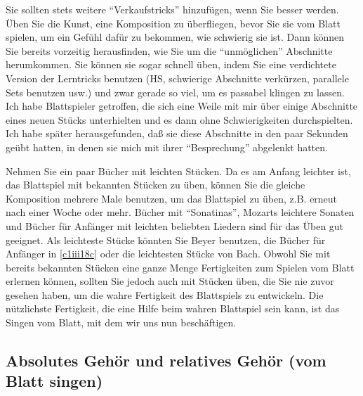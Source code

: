 Sie sollten stets weitere \enquote{Verkaufstricks} hinzufügen, wenn Sie besser werden.
Üben Sie die Kunst, eine Komposition zu überfliegen, bevor Sie sie vom Blatt spielen, um ein Gefühl dafür zu bekommen, wie schwierig sie ist.
Dann können Sie bereits vorzeitig herausfinden, wie Sie um die \enquote{unmöglichen} Abschnitte herumkommen.
Sie können sie sogar schnell üben, indem Sie eine verdichtete Version der Lerntricks benutzen (HS, schwierige Abschnitte verkürzen, parallele Sets benutzen usw.) und zwar gerade so viel, um es passabel klingen zu lassen.
Ich habe Blattspieler getroffen, die sich eine Weile mit mir über einige Abschnitte eines neuen Stücks unterhielten und es dann ohne Schwierigkeiten durchspielten.
Ich habe später herausgefunden, daß sie diese Abschnitte in den paar Sekunden geübt hatten, in denen sie mich mit ihrer \enquote{Besprechung} abgelenkt hatten.

Nehmen Sie ein paar Bücher mit leichten Stücken.
Da es am Anfang leichter ist, das Blattspiel mit bekannten Stücken zu üben, können Sie die gleiche Komposition mehrere Male benutzen, um das Blattspiel zu üben, z.B. erneut nach einer Woche oder mehr.
Bücher mit \enquote{Sonatinas}, Mozarts leichtere Sonaten und Bücher für Anfänger mit leichten beliebten Liedern sind für das Üben gut geeignet.
Als leichteste Stücke könnten Sie Beyer benutzen, die Bücher für Anfänger in \autoref{c1iii18c} oder die leichtesten Stücke von Bach. 
Obwohl Sie mit bereits bekannten Stücken eine ganze Menge Fertigkeiten zum Spielen vom Blatt erlernen können, sollten Sie jedoch auch mit Stücken üben, die Sie nie zuvor gesehen haben, um die wahre Fertigkeit des Blattspiels zu entwickeln.
Die nützlichste Fertigkeit, die eine Hilfe beim wahren Blattspiel sein kann, ist das Singen vom Blatt, mit dem wir uns nun beschäftigen.


\subsection{Absolutes Gehör und relatives Gehör (vom Blatt singen)}
\label{c1iii12}


